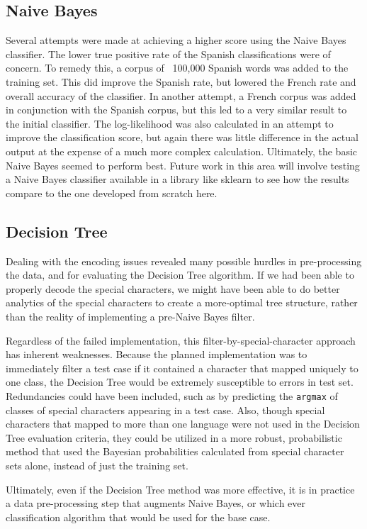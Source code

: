 \documentclass[conference]{IEEEtran}
\begin{document}
\subsection{Naive Bayes}
Several attempts were made at achieving a higher score using the Naive Bayes classifier. The lower true positive rate of the Spanish classifications were of concern. To remedy this, a corpus of ~100,000 Spanish words was added to the training set. This did improve the Spanish rate, but lowered the French rate and overall accuracy of the classifier. In another attempt, a French corpus was added in conjunction with the Spanish corpus, but this led to a very similar result to the initial classifier.
The log-likelihood was also calculated in an attempt to improve the classification score, but again there was little difference in the actual output at the expense of a much more complex calculation. Ultimately, the basic Naive Bayes seemed to perform best. Future work in this area will involve testing a Naive Bayes classifier available in a library like sklearn to see how the results compare to the one developed from scratch here. 

\subsection{Decision Tree}
Dealing with the encoding issues revealed many possible hurdles in pre-processing the data, and for evaluating the Decision Tree algorithm. If we had been able to properly decode the special characters, we might have been able to do better analytics of the special characters to create a more-optimal tree structure, rather than the reality of implementing a pre-Naive Bayes filter.

Regardless of the failed implementation, this filter-by-special-character approach has inherent weaknesses. Because the planned implementation was to immediately filter a test case if it contained a character that mapped uniquely to one class, the Decision Tree would be extremely susceptible to errors in test set. Redundancies could have been included, such as by predicting the \texttt{argmax} of classes of special characters appearing in a test case. Also, though special characters that mapped to more than one language were not used in the Decision Tree evaluation criteria, they could be utilized in a more robust, probabilistic method that used the  Bayesian probabilities calculated from special character sets alone, instead of just the training set.

Ultimately, even if the Decision Tree method was more effective, it is in practice a data pre-processing step that augments Naive Bayes, or which ever classification algorithm that would be used for the base case. 
\end{document}
